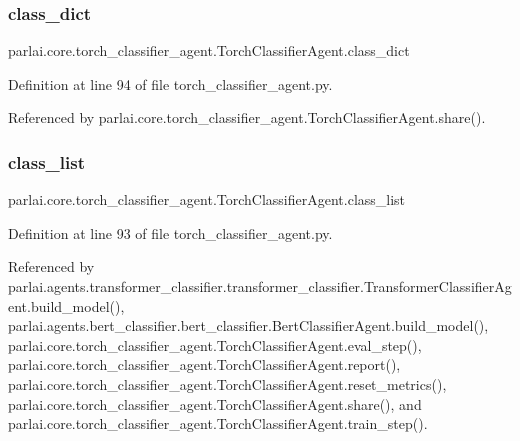\subsubsection{\texorpdfstring{class\+\_\+dict}{class\_dict}}
{\footnotesize\ttfamily parlai.\+core.\+torch\+\_\+classifier\+\_\+agent.\+Torch\+Classifier\+Agent.\+class\+\_\+dict}



Definition at line 94 of file torch\+\_\+classifier\+\_\+agent.\+py.



Referenced by parlai.\+core.\+torch\+\_\+classifier\+\_\+agent.\+Torch\+Classifier\+Agent.\+share().

\mbox{\label{classparlai_1_1core_1_1torch__classifier__agent_1_1TorchClassifierAgent_a98e1aad7d454f0ef1a971b60db1bcd18}} 
\subsubsection{\texorpdfstring{class\+\_\+list}{class\_list}}
{\footnotesize\ttfamily parlai.\+core.\+torch\+\_\+classifier\+\_\+agent.\+Torch\+Classifier\+Agent.\+class\+\_\+list}



Definition at line 93 of file torch\+\_\+classifier\+\_\+agent.\+py.



Referenced by parlai.\+agents.\+transformer\+\_\+classifier.\+transformer\+\_\+classifier.\+Transformer\+Classifier\+Agent.\+build\+\_\+model(), parlai.\+agents.\+bert\+\_\+classifier.\+bert\+\_\+classifier.\+Bert\+Classifier\+Agent.\+build\+\_\+model(), parlai.\+core.\+torch\+\_\+classifier\+\_\+agent.\+Torch\+Classifier\+Agent.\+eval\+\_\+step(), parlai.\+core.\+torch\+\_\+classifier\+\_\+agent.\+Torch\+Classifier\+Agent.\+report(), parlai.\+core.\+torch\+\_\+classifier\+\_\+agent.\+Torch\+Classifier\+Agent.\+reset\+\_\+metrics(), parlai.\+core.\+torch\+\_\+classifier\+\_\+agent.\+Torch\+Classifier\+Agent.\+share(), and parlai.\+core.\+torch\+\_\+classifier\+\_\+agent.\+Torch\+Classifier\+Agent.\+train\+\_\+step().

